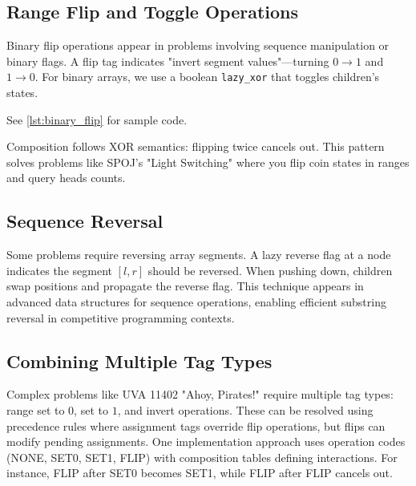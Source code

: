 \subsection{Range Flip and Toggle Operations}
Binary flip operations appear in problems involving sequence manipulation or binary flags. A flip tag indicates "invert segment values"—turning $0 \to 1$ and $1 \to 0$. For binary arrays, we use a boolean \texttt{lazy\_xor} that toggles children's states.
\begin{marginnoteenv}
    See \ref{lst:binary_flip} for sample code.
\end{marginnoteenv}
Composition follows XOR semantics: flipping twice cancels out. This pattern solves problems like SPOJ's "Light Switching" where you flip coin states in ranges and query heads counts.
\subsection{Sequence Reversal}
Some problems require reversing array segments. A lazy reverse flag at a node indicates the segment $[l,r]$ should be reversed. When pushing down, children swap positions and propagate the reverse flag.
This technique appears in advanced data structures for sequence operations, enabling efficient substring reversal in competitive programming contexts.
\subsection{Combining Multiple Tag Types}
Complex problems like UVA 11402 "Ahoy, Pirates!" require multiple tag types: range set to $0$, set to $1$, and invert operations. These can be resolved using precedence rules where assignment tags override flip operations, but flips can modify pending assignments.
One implementation approach uses operation codes (NONE, SET0, SET1, FLIP) with composition tables defining interactions. For instance, FLIP after SET0 becomes SET1, while FLIP after FLIP cancels out.
